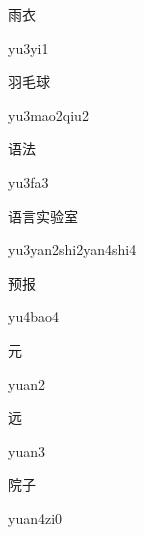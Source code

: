 \begin{multicols*}{2}
\begin{verbete}[yu3yi1]{雨衣}
\begin{pronuncia}{yu3yi1}
\end{pronuncia}
\end{verbete}

\begin{verbete}{羽毛球}
\begin{pronuncia}{yu3mao2qiu2}
\end{pronuncia}
\end{verbete}

\begin{verbete}[yu3fa3]{语法}
\begin{pronuncia}{yu3fa3}
\end{pronuncia}
\end{verbete}

\begin{verbete}{语言实验室}
\begin{pronuncia}[\\]{yu3yan2shi2yan4shi4}
\end{pronuncia}
\end{verbete}

\begin{verbete}[yu4bao4]{预报}
\begin{pronuncia}{yu4bao4}
\end{pronuncia}
\end{verbete}

\begin{verbete}[yuan2]{元}
\begin{pronuncia}{yuan2}
\end{pronuncia}
\end{verbete}

\begin{verbete}[yuan3]{远}
\begin{pronuncia}{yuan3}
\end{pronuncia}
\end{verbete}

\begin{verbete}[yuan4zi0]{院子}
\begin{pronuncia}{yuan4zi0}
\end{pronuncia}
\end{verbete}


\end{multicols*}
